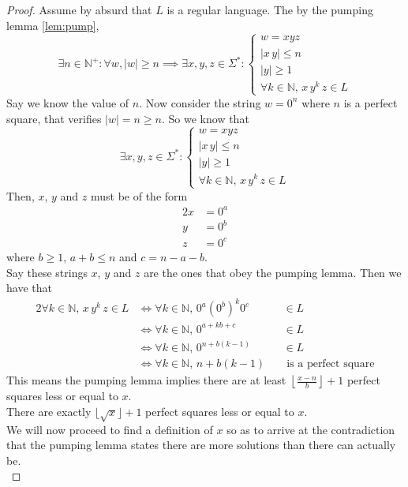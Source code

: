 \documentclass[docid=TP07]{tcom_TP}
\begin{document}
{\begin{proof}
Assume  by absurd that $L$ is a regular language. The by the pumping lemma \eqref{lem:pump},
\begin{equation*}
	\exists n \in \mathbb{N}^+ \colon \forall w, |w|\geq n \implies \exists x, y, z \in \Sigma^* \colon 
	\begin{cases}
		w = xyz \\
		|x\,y| \leq n\\
		|y| \geq 1\\
		\forall k \in \mathbb{N},\,x\,y^k\,z \in L
\end{cases}
\end{equation*}
Say we know the value of $n$. Now consider the string $w=0^n$ where $n$ is a perfect square, that verifies $|w|=n \geq n$. So we know that
\begin{equation*}
\exists x, y, z \in \Sigma^* \colon 
\begin{cases}
	w = xyz \\
	|x\,y| \leq n\\
	|y| \geq 1\\
	\forall k \in \mathbb{N},\,x\,y^k\,z \in L
\end{cases}
\end{equation*}
Then, $x$, $y$ and $z$ must be of the form
\begin{alignat*}{2}
	x &= 0^a\\
	y &= 0^b\\
	z &= 0^c
\end{alignat*}
where $b \geq 1$, $a+b \leq n$ and $c=n-a-b$.\\
Say these strings $x$, $y$ and $z$ are the ones that obey the pumping lemma. Then we have that
\begin{alignat*}{2}
	\forall k \in \mathbb{N},\,x\,y^k\,z \in L
	& \iff \forall k \in \mathbb{N},\,0^a(0^b)^k0^c && \in L \\
	& \iff \forall k \in \mathbb{N},\,0^{a+kb+c}    && \in L \\
	& \iff \forall k \in \mathbb{N},\,0^{n+b(k-1)}  && \in L \\
	& \iff \forall k \in \mathbb{N},\,n+b(k-1)      && \text{ is a perfect square}
\end{alignat*}
This means the pumping lemma implies there are at least $\left\lfloor \frac{x-n}{b} \right\rfloor +1$ perfect squares less or equal to $x$.\\
There are exactly $\lfloor \sqrt{x} \rfloor +1$ perfect squares less or equal to $x$.\\
We will now proceed to find a definition of $x$ so as to arrive at the contradiction that the pumping lemma states there are more solutions than there can actually be.\\

\end{proof}}
\end{document}

